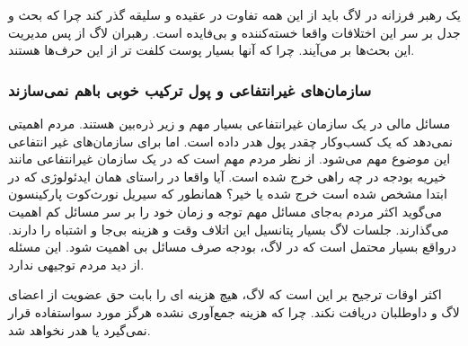 یک رهبر فرزانه در لاگ باید از این همه تفاوت در عقیده و سلیقه گذر کند چرا که بحث و جدل
بر سر این اختلافات واقعا خسته‌کننده و بی‌فایده است. رهبران لاگ از پس مدیریت این بحث‌ها 
بر می‌آیند. چرا که آنها بسیار پوست کلفت تر از این حرف‌ها هستند.

\subsubsection{سازمان‌های غیرانتفاعی و پول ترکیب خوبی باهم نمی‌سازند}

مسائل مالی در یک سازمان غیرانتفاعی بسیار مهم و زیر ذره‌بین هستند. مردم اهمیتی نمی‌دهد
که یک کسب‌وکار چقدر پول هدر داده است. اما برای سازمان‌های غیر انتفاعی این موضوع مهم می‌شود.
از نظر مردم مهم است که در یک سازمان غیرانتفاعی مانند خیریه بودجه در چه راهی خرج شده است.
آیا واقعا در راستای همان ایدئولوژی که در ابتدا مشخص شده است خرج شده یا خیر؟
همانطور که سیریل نورث‌کوت پارکینسون می‌گوید
اکثر مردم به‌جای مسائل مهم توجه و زمان خود را بر سر مسائل کم اهمیت می‌گذارند.
جلسات لاگ بسیار پتانسیل این اتلاف وقت و هزینه بی‌جا و اشتباه را دارند. درواقع بسیار محتمل است
که در لاگ، بودجه صرف مسائل بی اهمیت شود. این مسئله از دید مردم توجیهی ندارد.

اکثر اوقات ترجیح بر این است که لاگ، هیچ هزینه ای را بابت حق عضویت از اعضای لاگ و داوطلبان دریافت نکند.
چرا که هزینه جمع‌آوری نشده هرگز مورد سواستفاده قرار نمی‌گیرد یا هدر نخواهد شد.

